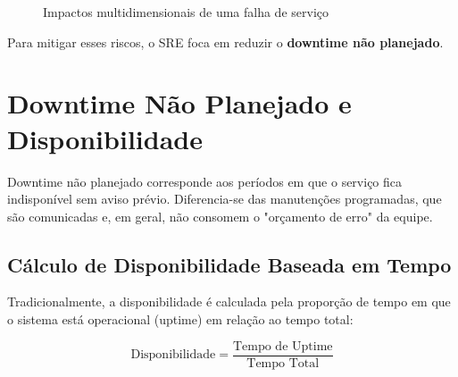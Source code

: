\documentclass[12pt,a4paper,twoside]{report}
\begin{document}
\begin{figure}[h]
    \centering
    \caption{Impactos multidimensionais de uma falha de serviço}
    \label{fig:impactos-falha}
\end{figure}

Para mitigar esses riscos, o SRE foca em reduzir o \textbf{downtime não planejado}.

\section{Downtime Não Planejado e Disponibilidade}

Downtime não planejado corresponde aos períodos em que o serviço fica indisponível sem aviso prévio. Diferencia-se das manutenções programadas, que são comunicadas e, em geral, não consomem o "orçamento de erro" da equipe.

\subsection{Cálculo de Disponibilidade Baseada em Tempo}

Tradicionalmente, a disponibilidade é calculada pela proporção de tempo em que o sistema está operacional (uptime) em relação ao tempo total:

\begin{equation}
\text{Disponibilidade} = \frac{\text{Tempo de Uptime}}{\text{Tempo Total}}
\end{equation}
\end{document}
